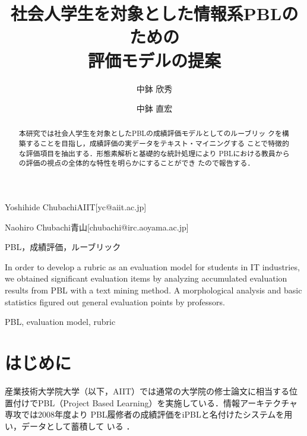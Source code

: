 \documentclass[submit]{ipsj}
\begin{document}
\title{社会人学生を対象とした情報系PBLのための\\
評価モデルの提案}


\author{中鉢 欣秀}{Yoshihide Chubachi}{AIIT}[yc@aiit.ac.jp]
\author{中鉢 直宏}{Naohiro Chubachi}{青山}[chubachi@irc.aoyama.ac.jp]

\begin{abstract}
 本研究では社会人学生を対象としたPBLの成績評価モデルとしてのルーブリッ
 クを構築することを目指し，成績評価の実データをテキスト・マイニングする
 ことで特徴的な評価項目を抽出する．形態素解析と基礎的な統計処理により
 PBLにおける教員からの評価の視点の全体的な特性を明らかにすることができ
 たので報告する．
\end{abstract}

\begin{jkeyword}
PBL，成績評価，ルーブリック
\end{jkeyword}

\begin{eabstract}
 In order to develop a rubric as an evaluation model for students in
 IT industries, we obtained significant evaluation items by analyzing
 accumulated evaluation results from PBL with a text mining method. A
 morphological analysis and basic statistics figured out general
 evaluation points by professors.
\end{eabstract}

\begin{ekeyword}
PBL, evaluation model, rubric
\end{ekeyword}

\maketitle

\section{はじめに}
産業技術大学院大学（以下，AIIT）では通常の大学院の修士論文に相当する位
置付けでPBL（Project Based Learning）を実施している\cite{戸沢義%
夫:2007-08-23,酒森潔:2012-05}．情報アーキテクチャ専攻では2008年度より
PBL履修者の成績評価をiPBLと名付けたシステムを用い，データとして蓄積して
いる\cite{中鉢欣秀:2009-05} ．
\end{document}
